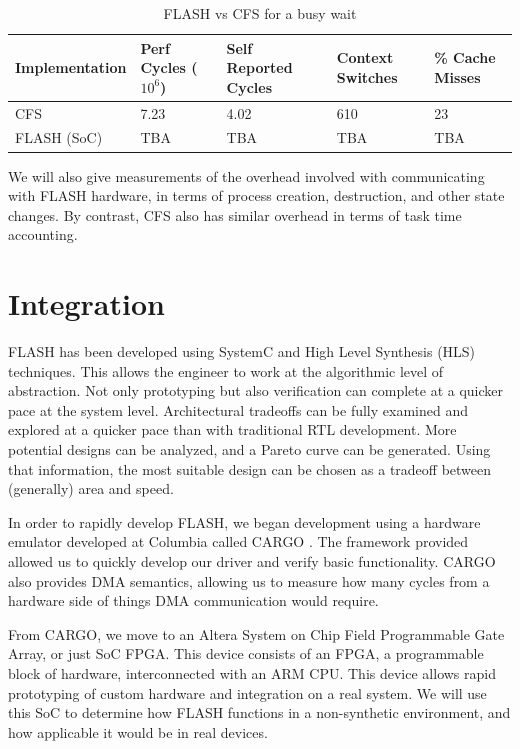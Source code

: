 \documentclass{sig-alternate-10pt}
\begin{document}
\begin{table}[t]
	\begin{center}
		\begin{tabular}{@{}lllll@{}}
			\toprule
			Implementation & Perf Cycles ($10^6$) & Self Reported Cycles & Context Switches & \% Cache Misses \\ \midrule
			CFS            & 7.23                               & 4.02                 & 610              & 23              \\
			FLASH (SoC)    & TBA                                & TBA                  & TBA              & TBA             \\ \bottomrule
		\end{tabular}
		\caption{FLASH vs CFS for a busy wait}
		\label{table:perf}
	\end{center}
\end{table}

We will also give measurements of the overhead involved with communicating with FLASH hardware, in terms of process creation, destruction, and other state changes. By contrast, CFS also has similar overhead in terms of task time accounting.

\section{Integration}
FLASH has been developed using SystemC and High Level Synthesis (HLS)
techniques.  This allows the engineer to work at the algorithmic level of
abstraction.  Not only prototyping but also verification can complete at a
quicker pace at the system level.  Architectural tradeoffs can be fully
examined and explored at a quicker pace than with traditional RTL
development.  More potential designs can be analyzed, and a Pareto curve can
be generated.  Using that information, the most suitable design can be
chosen as a tradeoff between (generally) area and speed.


In order to rapidly develop FLASH, we began development using a hardware emulator developed at Columbia called CARGO \cite{cargo}. The framework provided allowed us to quickly develop our driver and verify basic functionality. CARGO also provides DMA semantics, allowing us to measure how many cycles from a hardware side of things DMA communication would require.

From CARGO, we move to an Altera System on Chip Field Programmable Gate Array, or just SoC FPGA. This device consists of an FPGA, a programmable block of hardware, interconnected with an ARM CPU. This device allows rapid prototyping of custom hardware and integration on a real system. We will use this SoC to determine how FLASH functions in a non-synthetic environment, and how applicable it would be in real devices.
\end{document}
